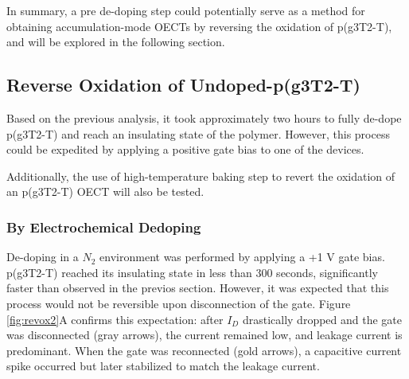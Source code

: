 In summary, a pre de-doping step could potentially serve as a method for obtaining accumulation-mode OECTs by reversing the oxidation of p(g3T2-T), and will be explored in the following section.

\subsection{Reverse Oxidation of Undoped-p(g3T2-T)}
Based on the previous analysis, it took approximately two hours to fully de-dope p(g3T2-T) and reach an insulating state of the polymer. However, this process could be expedited by applying a positive gate bias to one of the devices.

Additionally, the use of high-temperature baking step to revert the oxidation of an p(g3T2-T) OECT %
will also be tested.   

\subsubsection{By Electrochemical Dedoping}
De-doping in a $N_{2}$ environment was performed by applying a +1 V gate bias. p(g3T2-T) reached its insulating state in less than 300 seconds, significantly faster than observed in the previos section. However, it was expected that this process would not be reversible upon disconnection of the gate. Figure \ref{fig:revox2}A confirms this expectation: after $I_{D}$ drastically dropped and the gate was disconnected (gray arrows), the current remained low, and leakage current is predominant. When the gate was reconnected (gold arrows), a capacitive current spike occurred but later stabilized to match the leakage current.


